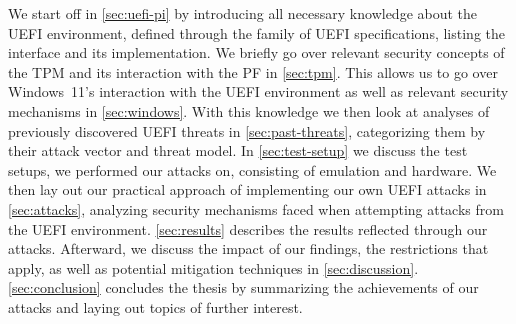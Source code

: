 We start off in \autoref{sec:uefi-pi} by introducing all necessary knowledge about the \ac{UEFI} environment, defined through the family of \ac{UEFI} specifications, listing the interface and its implementation.
We briefly go over relevant security concepts of the \ac{TPM} and its interaction with the \ac{PF} in \autoref{sec:tpm}.
This allows us to go over Windows~11's interaction with the \ac{UEFI} environment as well as relevant security mechanisms in \autoref{sec:windows}.
With this knowledge we then look at analyses of previously discovered \ac{UEFI} threats in \autoref{sec:past-threats}, categorizing them by their attack vector and threat model.
In \autoref{sec:test-setup} we discuss the test setups, we performed our attacks on, consisting of emulation and hardware.
We then lay out our practical approach of implementing our own \ac{UEFI} attacks in \autoref{sec:attacks}, analyzing security mechanisms faced when attempting attacks from the \ac{UEFI} environment.
\autoref{sec:results} describes the results reflected through our attacks.
Afterward, we discuss the impact of our findings, the restrictions that apply, as well as potential mitigation techniques in \autoref{sec:discussion}.
\autoref{sec:conclusion} concludes the thesis by summarizing the achievements of our attacks and laying out topics of further interest.